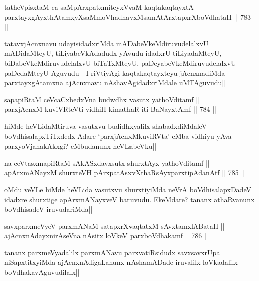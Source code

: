 \begin{shl}
tatheVpisxtaM ca saMpArxpatxmiteyxVvaM kaqtakaqtayxtA || \\
parxtayxgAyxthAtamxyXsaMmoVhadhavxMsamAtArxtapxrXboVdhataH ||  783 ||  
\end{shl}

\begin{artha} 
tatavxjAcnxnavu udayisidadxriMda mADabeVkeMdiruvudelalxvU mADidaMteyU, 
tiLiyabeVkAdadudx yAvudu idadxrU tiLiyadaMteyU, 
biDabeVkeMdiruvudelalxvU biTaTxMteyU, paDeyabeVkeMdiruvudelalxvU 
paDedaMteyU Aguvudu - I riVtiyAgi kaqtakaqtayxteyu jAcnxnadiMda 
parxtayxgAtamxna ajAcnxnavu nAshavAgidadxriMdale uMTAguvudu||
\end{artha}


\begin{shl}
sapapiRtaM ceVcaCxbedxVna budwdhx vasutx yathoVditamf || \\
parxjAcnxM kuviVRteVti vidhiH kimathaR iti BaNayxtAmf ||  784 ||  
\end{shl}

\begin{artha} 
hiMde heVLidaMtiruva vasutxvu budidhxyalilx shabadxdiMdaleV 
boVdhisalapxTiTxdedx Adare `parxjAcnxMkuviRVta' eMba vidhiyu yAva 
parxyoVjanakAkxgi? eMbudanunx heVLabeVku||
\end{artha}

\begin{shl}
na ceVtasxmapiRtaM sAkASxdavxsutx shurxtAyx yathoVditamf ||  \\
apArxmANayxM shurxteVH pArxpatAsxvXthaRsAyxparxtipAdanAtf ||  785 ||  
\end{shl}

\begin{artha} 
oMdu veVLe hiMde heVLida vasutxvu shurxtiyiMda neVrA boVdhisalapxDadeV 
idadxre shurxtige apArxmANayxveV baruvudu. EkeMdare? tananx 
athaRvanunx boVdhisadeV iruvudariMda||
\end{artha}


\begin{shl}
savxparxmeVyeV parxmANaM satapxrXvaqtatxM sAvxtamxlABataH || \\
ajAcnxnAdayxnirAseVna nAsitx loVkeV parxboVdhakamf ||  786 ||  
\end{shl}

\begin{artha} 
tananx parxmeVyadalilx parxmANavu parxvatiRsidudx savxsavxrUpa 
niSapxtitxyiMda ajAcnxnAdigaLanunx nAshamADade iruvalilx loVkadalilx 
boVdhakavAguvudilalx||
\end{artha}

